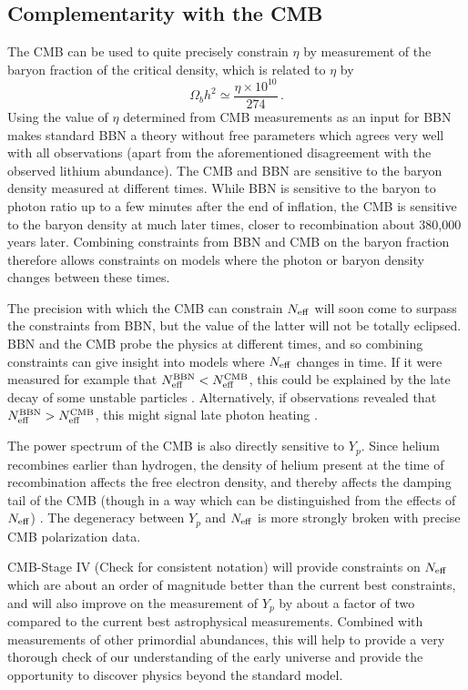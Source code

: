 \subsection{Complementarity with the CMB}\label{Complementarity}
The CMB can be used to quite precisely constrain $\eta$ by measurement of the baryon fraction of the critical density, which is related to $\eta$ by
\begin{equation}
	\Omega_b h^2 \simeq \frac{\eta\times10^{10}}{274} \, .
\end{equation}
Using the value of $\eta$ determined from CMB measurements as an input for BBN makes standard BBN a theory without free parameters which agrees very well with all observations (apart from the aforementioned disagreement with the observed lithium abundance).  The CMB and BBN are sensitive to the baryon density measured at different times.  While BBN is sensitive to the baryon to photon ratio up to a few minutes after the end of inflation, the CMB is sensitive to the baryon density at much later times, closer to recombination about 380,000 years later.  Combining constraints from BBN and CMB on the baryon fraction therefore allows constraints on models where the photon or baryon density changes between these times.

The precision with which the CMB can constrain $N_{\rm eff}$ will soon come to surpass the constraints from BBN, but the value of the latter will not be totally eclipsed.  BBN and the CMB probe the physics at different times, and so combining constraints can give insight into models where $N_{\rm eff}$ changes in time.  If it were measured for example that $N_{\rm eff}^{\mathrm{BBN}}<N_{\rm eff}^{\mathrm{CMB}}$, this could be explained by the late decay of some unstable particles \cite{Fischler:2010xz,Menestrina:2011mz,Hooper:2011aj}.  Alternatively, if observations revealed that $N_{\rm eff}^{\mathrm{BBN}}>N_{\rm eff}^{\mathrm{CMB}}$, this might signal late photon heating \cite{Cadamuro:2010cz,Millea:2015qra}.

The power spectrum of the CMB is also directly sensitive to $Y_p$.  Since helium recombines earlier than hydrogen, the density of helium present at the time of recombination affects the free electron density, and thereby affects the damping tail of the CMB (though in a way which can be distinguished from the effects of $N_{\rm eff}$) \cite{Bashinsky:2003tk,Hou:2011ec,Follin:2015hya,Baumann:2015rya}.  The degeneracy between $Y_p$ and $N_{\rm eff}$ is more strongly broken with precise CMB polarization data.

CMB-Stage IV {\color{blue} (Check for consistent notation)} will provide constraints on $N_{\rm eff}$ which are about an order of magnitude better than the current best constraints, and will also improve on the measurement of $Y_p$ by about a factor of two compared to the current best astrophysical measurements.  Combined with measurements of other primordial abundances, this will help to provide a very thorough check of our understanding of the early universe and provide the opportunity to discover physics beyond the standard model.









